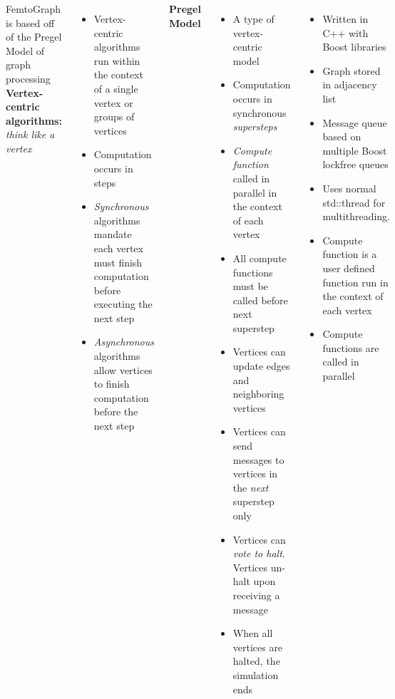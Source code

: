 \documentclass[25pt, portrait,  margin=0mm, innermargin=15mm,
  blockverticalspace=15mm, colspace=15mm, subcolspace=8mm]{tikzposter}
\begin{document}
\begin{columns}
     {
      FemtoGraph is based off of the Pregel Model of graph processing\\
      \textbf{Vertex-centric algorithms:} \textit{think like a vertex}
      \begin{itemize}
      \item Vertex-centric algorithms run within the context of a single vertex or groups of vertices
      \item Computation occurs in steps
      \item \textit{Synchronous} algorithms mandate each vertex must finish computation before executing the next step
      \item \textit{Asynchronous} algorithms allow vertices to finish computation before the next step
      \end{itemize}

      \textbf{Pregel Model}
      \begin{itemize}
      \item A type of vertex-centric model
      \item Computation occurs in synchronous \textit{supersteps}
      \item \textit{Compute function} called in parallel in the context of each vertex
      \item All compute functions must be called before next superstep
      \item Vertices can update edges and neighboring vertices
      \item Vertices can send messages to vertices in the \textit{next} superstep only
      \item Vertices can \textit{vote to halt}. Vertices un-halt upon receiving a message
      \item When all vertices are halted, the simulation ends
      \end{itemize}
      
      }

     {

      \begin{itemize}
      \item Written in C++ with Boost libraries
      \item Graph stored in adjacency list
      \item Message queue based on multiple Boost lockfree queues
      \item Uses normal std::thread for multithreading.
      \item Compute function is a user defined function run in the context of each vertex
      \item Compute functions are called in parallel
      \end{itemize}


}
\end{columns}
\end{document}
